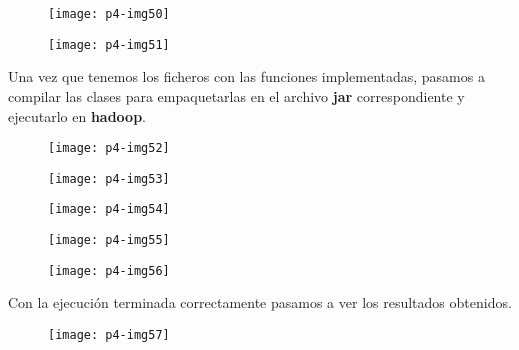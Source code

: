 \documentclass[10pt]{article}
\begin{document}
\begin{figure}[H]
	\begin{center}
 		\texttt{[image: p4-img50]}
	\end{center} 
\end{figure}

\begin{figure}[H]
	\begin{center}
 		\texttt{[image: p4-img51]}
	\end{center} 
\end{figure}

Una vez que tenemos los ficheros con las funciones implementadas, pasamos a compilar las clases para empaquetarlas en el archivo \textbf{jar} correspondiente y ejecutarlo en \textbf{hadoop}.\\

\begin{figure}[H]
	\begin{center}
 		\texttt{[image: p4-img52]}
	\end{center} 
\end{figure}

\begin{figure}[H]
	\begin{center}
 		\texttt{[image: p4-img53]}
	\end{center} 
\end{figure}

\begin{figure}[H]
	\begin{center}
 		\texttt{[image: p4-img54]}
	\end{center} 
\end{figure}

\begin{figure}[H]
	\begin{center}
 		\texttt{[image: p4-img55]}
	\end{center} 
\end{figure}

\begin{figure}[H]
	\begin{center}
 		\texttt{[image: p4-img56]}
	\end{center} 
\end{figure}

Con la ejecución terminada correctamente pasamos a ver los resultados obtenidos. \\

\begin{figure}[H]
	\begin{center}
 		\texttt{[image: p4-img57]}
	\end{center} 
\end{figure}
\end{document}
